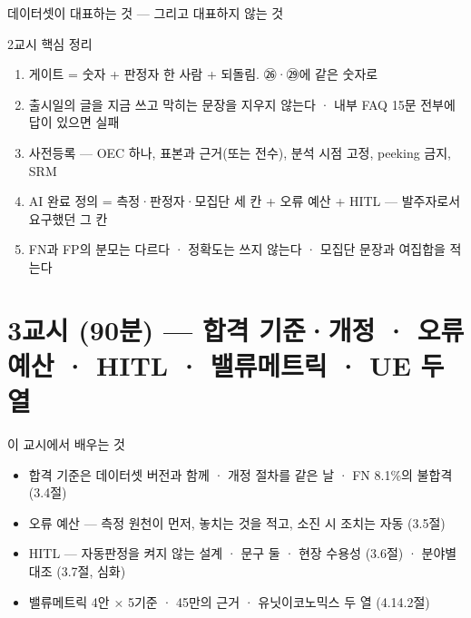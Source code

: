 \begin{frame}{데이터셋이 대표하는 것 — 그리고 대표하지 않는 것}
\end{frame}

\begin{frame}{2교시 핵심 정리}
\begin{enumerate}
\item 게이트 = 숫자 + 판정자 한 사람 + 되돌림. ㉖·㉙에 같은 숫자로
\item 출시일의 글을 지금 쓰고 막히는 문장을 지우지 않는다 · 내부 FAQ 15문 전부에 답이 있으면 실패
\item 사전등록 — OEC 하나, 표본과 근거(또는 전수), 분석 시점 고정, peeking 금지, SRM
\item AI 완료 정의 = 측정·판정자·모집단 세 칸 + 오류 예산 + HITL — 발주자로서 요구했던 그 칸
\item FN과 FP의 분모는 다르다 · 정확도는 쓰지 않는다 · 모집단 문장과 여집합을 적는다
\end{enumerate}
\end{frame}

\section{3교시 (90분) — 합격 기준·개정 · 오류 예산 · HITL · 밸류메트릭 · UE 두 열}
\begin{frame}{이 교시에서 배우는 것}
\begin{itemize}
\item 합격 기준은 데이터셋 버전과 함께 · 개정 절차를 같은 날 · FN 8.1\%의 불합격 (3.4절)
\item 오류 예산 — 측정 원천이 먼저, 놓치는 것을 적고, 소진 시 조치는 자동 (3.5절)
\item HITL — 자동판정을 켜지 않는 설계 · 문구 둘 · 현장 수용성 (3.6절) · 분야별 대조 (3.7절, 심화)
\item 밸류메트릭 4안 × 5기준 · 45만의 근거 · 유닛이코노믹스 두 열 (4.1\til{}4.2절)
\end{itemize}
\end{frame}

